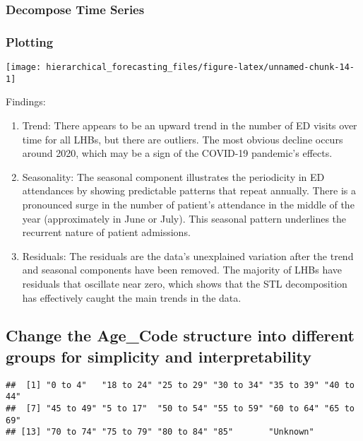 \documentclass[
]{article}
\begin{document}
\hypertarget{decompose-time-series}{%
\subsubsection{Decompose Time Series}\label{decompose-time-series}}

\hypertarget{plotting}{%
\subsubsection{Plotting}\label{plotting}}

\texttt{[image: hierarchical\_forecasting\_files/figure-latex/unnamed-chunk-14-1]}

Findings:

\begin{enumerate}
\def\labelenumi{\arabic{enumi}.}
\item
  Trend:
  There appears to be an upward trend in the number of ED visits over time for all LHBs, but there are outliers.
  The most obvious decline occurs around 2020, which may be a sign of the COVID-19 pandemic's effects.
\item
  Seasonality:
  The seasonal component illustrates the periodicity in ED attendances by showing predictable patterns that repeat annually.
  There is a pronounced surge in the number of patient's attendance in the middle of the year (approximately in June or July). This seasonal pattern underlines the recurrent nature of patient admissions.
\item
  Residuals:
  The residuals are the data's unexplained variation after the trend and seasonal components have been removed.
  The majority of LHBs have residuals that oscillate near zero, which shows that the STL decomposition has effectively caught the main trends in the data.
\end{enumerate}

\newpage

\hypertarget{change-the-age_code-structure-into-different-groups-for-simplicity-and-interpretability}{%
\subsection{Change the Age\_Code structure into different groups for simplicity and interpretability}\label{change-the-age_code-structure-into-different-groups-for-simplicity-and-interpretability}}

\begin{verbatim}
##  [1] "0 to 4"   "18 to 24" "25 to 29" "30 to 34" "35 to 39" "40 to 44"
##  [7] "45 to 49" "5 to 17"  "50 to 54" "55 to 59" "60 to 64" "65 to 69"
## [13] "70 to 74" "75 to 79" "80 to 84" "85"       "Unknown"
\end{verbatim}
\end{document}
